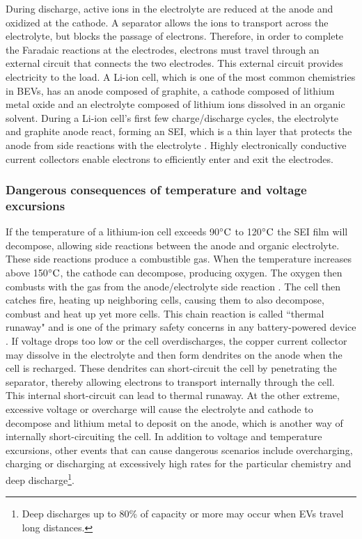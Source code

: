 During discharge, active ions in the electrolyte are reduced at the anode and oxidized at the cathode. A separator allows the ions to transport across the electrolyte, but blocks the passage of electrons. Therefore, in order to complete the Faradaic reactions at the electrodes, electrons must travel through an external circuit that connects the two electrodes. This external circuit provides electricity to the load. A Li-ion cell, which is one of the most common chemistries in BEVs, has an anode composed of graphite, a cathode composed of lithium metal oxide and an electrolyte composed of lithium ions dissolved in an organic solvent. During a Li-ion cell's first few charge/discharge cycles, the electrolyte and graphite anode react, forming an SEI, which is a thin layer that protects the anode from side reactions with the electrolyte \cite{SEIFormation}. Highly electronically conductive current collectors enable electrons to efficiently enter and exit the electrodes.
		\subsubsection{Dangerous consequences of temperature and voltage excursions}
		If the temperature of a lithium-ion cell exceeds 90$^{\circ}{\rm C}$ to 120$^{\circ}{\rm C}$ the SEI film will decompose, allowing side reactions between the anode and organic electrolyte. These side reactions produce a combustible gas. When the temperature increases above 150$^{\circ}{\rm C}$, the cathode can decompose, producing oxygen. The oxygen then combusts with the gas from the anode/electrolyte side reaction \cite[p.~273]{LanguangLuXuebingHanJianqiuLiJianfengHua2013}. The cell then catches fire, heating up neighboring cells, causing them to also decompose, combust and heat up yet more cells. This chain reaction is called ``thermal runaway" and is one of the primary safety concerns in any battery-powered device \cite{BULiIonSafetyConcerns}. If voltage drops too low or the cell  overdischarges, the copper current collector may dissolve in the electrolyte and then form dendrites on the anode when the cell is recharged. These dendrites can short-circuit the cell by penetrating the separator, thereby allowing electrons to transport internally through the cell.  This internal short-circuit can lead to thermal runaway. At the other extreme, excessive voltage or overcharge will cause the electrolyte and cathode to decompose and lithium metal to deposit on the anode, which is another way of internally short-circuiting the cell\cite[p.~273]{LanguangLuXuebingHanJianqiuLiJianfengHua2013}.
In addition to voltage and temperature excursions, other events that can cause dangerous scenarios include overcharging, charging or discharging at excessively high rates for the particular chemistry and deep discharge\footnote{Deep discharges up to 80\%  of capacity or more may occur when EVs travel long distances\cite[p.~6]{HabiballahRahimi-EichiUnnatiOhjaFedericoBaronti2013}.}.
